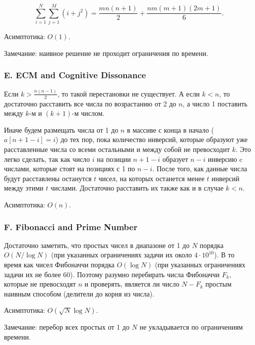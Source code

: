 
$$\sum_{i=1}^{N} \sum_{j=1}^{M} (i + j^2) = \frac{m n (n+1)}{2} + \frac{n m (m+1) (2m+1)}{6}.$$

Асимптотика: $O(1)$.

Замечание: наивное решение не проходит ограничения по времени.



\subsubsection*{E. ECM and Cognitive Dissonance} 


Если $k > \frac{n (n-1)}{2}$, то такой перестановки не существует. А если $k < n$, то достаточно расставить все числа по возрастанию от 2 до $n$, а число 1 поставить между $k$-м и $(k+1)$-м числом. 

Иначе будем размещать числа от 1 до $n$ в массиве с конца в начало ($a[n + 1 - i] = i$) до тех пор, пока количество инверсий, которые образуют уже расставленные числа со всеми остальными и между собой не превосходит $k$. Это легко сделать, так как число $i$ на позиции $n + 1 - i$ образует $n-i$ инверсию c числами, которые стоят на позициях с 1 по $n - i$. После того, как данные числа будут расставлены останутся $t$ чисел, на которых останется менее $t$ инверсий между этими $t$ числами. Достаточно расставить их также как и в случае $k < n$.

Асимптотика: $O(n)$.



\subsubsection*{F. Fibonacci and Prime Number} 


Достаточно заметить, что простых чисел в диапазоне от 1 до $N$ порядка $O(N / \log{N})$ (при указанных ограничениях задачи их около $4\cdot 10^{10}$). В то время как чисел Фибоначчи порядка $O(\log{N})$ (при указанных ограничениях задачи их не более 60). Поэтому разумно перебирать числа Фибоначчи $F_k$, которые не превосходят $n$ и проверять, является ли число $N - F_k$ простым наивным способом (делители до корня из числа).

Асимптотика: $O(\sqrt{N} \log{N})$.

Замечание: перебор всех простых от 1 до $N$ не укладывается по ограничениям времени.




